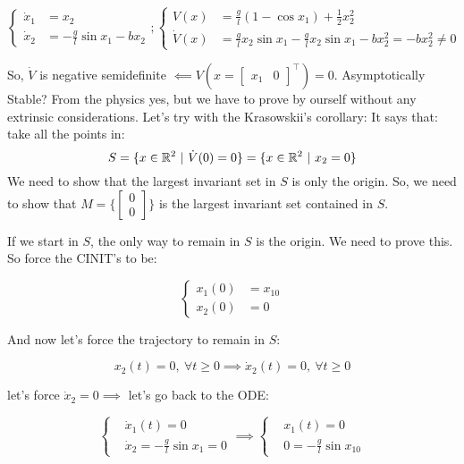 \[
	\left\{
	\begin{aligned}
	\dot{x}_1 &= x_2 \\
	\dot{x}_2 &= -\frac{g}{l}\sin{x_1} - bx_2
	\end{aligned} 
	\right. ;
	\left\{
	\begin{aligned}
	V(x) &= \frac{g}{l}(1-\cos{x_1}) + \frac{1}{2}x_{2}^2 \\
	\dot{V}(x) &= \frac{g}{l}x_2\sin{x_1}-\frac{g}{l}x_2\sin{x_1}-bx_{2}^2 = -bx_{2}^2 \neq 0
	\end{aligned} 
	\right.
\]

So, $\dot{V}$ is negative semidefinite $\impliedby V(x=\begin{bmatrix}x_1 & 0\end{bmatrix}^\top) = 0$.
Asymptotically Stable? From the physics yes, but we have to prove by ourself without any extrinsic considerations. Let's try with the Krasowskii's corollary:
It says that: take all the points in:
\[
	S = \{x \in \mathbb{R}^2\ |\ \dot{V}(0) = 0\} = \{x \in \mathbb{R}^2\ |\ x_2 = 0\}
\]
We need to show that the largest invariant set in $S$ is only the origin. So, we need to show that $M=\{\begin{bmatrix}0\\0\end{bmatrix}\}$ is the largest invariant set contained in $S$.

If we start in $S$, the only way to remain in $S$ is the origin. We need to prove this. So force the CINIT's to be: 

\[
	\left\{
	\begin{aligned}
	x_1(0) &= x_{10} \\
	x_2(0) &= 0
	\end{aligned} 
	\right.
\]

And now let's force the trajectory to remain in $S$:

\[
	x_2(t) = 0,\ \forall t \geq 0 \implies \dot{x}_2(t) = 0,\ \forall t \geq 0
\]

let's force $\dot{x}_2 = 0 \implies$ let's go back to the ODE:

\[
	\left\{
	\begin{aligned}
	&\dot{x}_1(t) = 0 \\
	&\dot{x}_2 = -\frac{g}{l}\sin{x_1} = 0
	\end{aligned} 
	\right. \implies \left\{
	\begin{aligned}
	&x_1(t) = 0 \\
	&0 = -\frac{g}{l}\sin{x_{10}}
	\end{aligned} 
	\right.
\]

